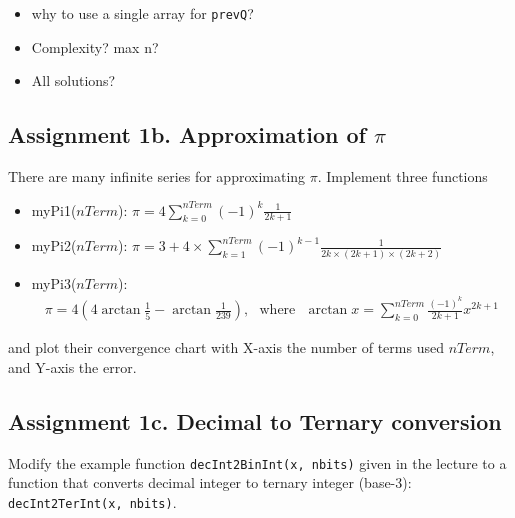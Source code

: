 \documentclass[12pt,a4paper,hidelinks,fleqn]{article}            %
\begin{document}
\begin{itemize}
\item why to use a single array for \verb=prevQ=?
\item Complexity? max n?
\item All solutions?
\end{itemize}

\subsection*{Assignment 1b. Approximation of $\pi$}
There are many infinite series for approximating $\pi$.
Implement three functions 
\begin{itemize}
\item myPi1($nTerm$): $\displaystyle \pi = 4 \sum_{k=0}^{nTerm} (-1)^{k}\frac{1}{2k+1}$
\item myPi2($nTerm$): $\displaystyle \pi = 3 + 4 \times \sum_{k=1}^{nTerm}(-1)^{k-1}\frac{1}{2k \times (2k+1) \times (2k+2)}$
\item myPi3($nTerm$): 
\begin{align*}
\pi = 4(4\arctan \frac{1}{5} - \arctan \frac{1}{239}), ~~~\text{where} 
~~~\arctan x = \sum_{k=0}^{nTerm} \frac{(-1)^k} {2k+1} x^{2k+1}
\end{align*}
\end{itemize}
and plot their convergence chart with X-axis the number of terms used $nTerm$, and Y-axis the error.

\subsection*{Assignment 1c. Decimal to Ternary conversion}
Modify the example function \verb=decInt2BinInt(x, nbits)= given in the lecture to  
a function that converts decimal integer to ternary integer (base-3): \verb=decInt2TerInt(x, nbits)=.
\end{document}
